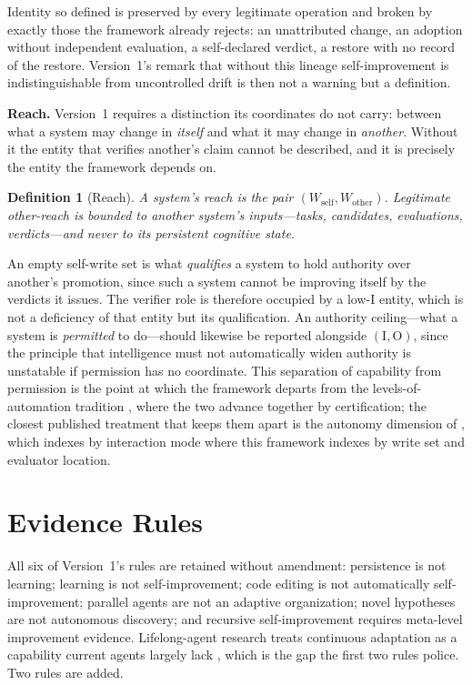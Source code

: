 \documentclass[11pt]{article}
\newtheorem{definition}{Definition}
\newcommand{\Ilev}[1]{\ensuremath{\mathrm{I}#1}}
\newcommand{\Olev}[1]{\ensuremath{\mathrm{O}#1}}
\begin{document}
Identity so defined is preserved by every legitimate operation and broken by exactly those the framework already rejects: an unattributed change, an adoption without independent evaluation, a self-declared verdict, a restore with no record of the restore. Version~1's remark that without this lineage self-improvement is indistinguishable from uncontrolled drift is then not a warning but a definition.

\textbf{Reach.} Version~1 requires a distinction its coordinates do not carry: between what a system may change in \emph{itself} and what it may change in \emph{another}. Without it the entity that verifies another's claim cannot be described, and it is precisely the entity the framework depends on.

\begin{definition}[Reach]
A system's reach is the pair $(W_{\text{self}}, W_{\text{other}})$. Legitimate other-reach is bounded to another system's \emph{inputs}---tasks, candidates, evaluations, verdicts---and never to its persistent cognitive state.
\end{definition}

An empty self-write set is what \emph{qualifies} a system to hold authority over another's promotion, since such a system cannot be improving itself by the verdicts it issues. The verifier role is therefore occupied by a low-\Ilev{} entity, which is not a deficiency of that entity but its qualification. An authority ceiling---what a system is \emph{permitted} to do---should likewise be reported alongside $(\Ilev{}, \Olev{})$, since the principle that intelligence must not automatically widen authority is unstatable if permission has no coordinate. This separation of capability from permission is the point at which the framework departs from the levels-of-automation tradition \citep{sheridan1978human,sae2021j3016}, where the two advance together by certification; the closest published treatment that keeps them apart is the autonomy dimension of \citet{morris2024levels}, which indexes by interaction mode where this framework indexes by write set and evaluator location.

\section{Evidence Rules}

All six of Version~1's rules are retained without amendment: persistence is not learning; learning is not self-improvement; code editing is not automatically self-improvement; parallel agents are not an adaptive organization; novel hypotheses are not autonomous discovery; and recursive self-improvement requires meta-level improvement evidence. Lifelong-agent research treats continuous adaptation as a capability current agents largely lack \citep{zheng2025lifelong}, which is the gap the first two rules police. Two rules are added.
\end{document}
